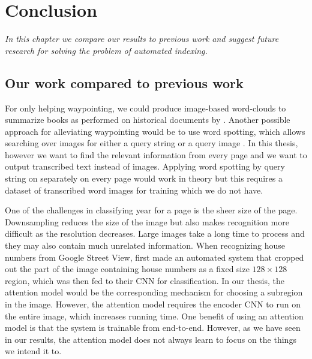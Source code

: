 \chapter{Conclusion}

\textit{In this chapter we compare our results to previous work and suggest future research for solving the problem of automated indexing.}

%
%


\section{Our work compared to previous work}

For only helping waypointing, we could produce image-based word-clouds to summarize books as performed on historical documents by \textcite{ImageCloud}. Another possible approach for alleviating waypointing would be to use word spotting, which allows searching over images for either a query string or a query image \textcite{WordSpotting}.
In this thesis, however we want to find the relevant information from every page and we want to output transcribed text instead of images. Applying word spotting by query string on separately on every page would work in theory but this requires a dataset of transcribed word images for training which we do not have.

One of the challenges in classifying year for a page is the sheer size of the page. Downsampling reduces the size of the image but also makes recognition more difficult as the resolution decreases. Large images take a long time to process and they may also contain much unrelated information. When recognizing house numbers from Google Street View, \textcite{multidigit_streetview} first made an automated system that cropped out the part of the image containing house numbers as a fixed size $128 \times 128$ region, which was then fed to their CNN for classification. In our thesis, the attention model would be the corresponding mechanism for choosing a subregion in the image. However, the attention model requires the encoder CNN to run on the entire image, which increases running time.
One benefit of using an attention model is that the system is trainable from end-to-end.
However, as we have seen in our results, the attention model does not always learn to focus on the things we intend it to.

